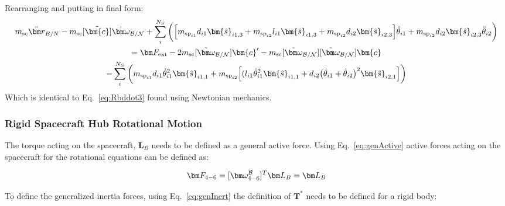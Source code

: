 Rearranging and putting in final form:
\begin{multline}
	m_{\text{sc}} \ddot{\bm r}_{B/N} -m_{\textnormal{sc}} [\tilde{\bm{c}}]\dot{\bm\omega}_{\cal B/N}
	+ \sum\limits_{i}^{N_S} \bigg( \Big[m_{\text{sp}_{i1}} d_{i1} \bm{\hat{s}}_{i1,3} + m_{\text{sp}_{i2}} l_{i1} \bm{\hat{s}}_{i1,3} +m_{\text{sp}_{i2}} d_{i2} \bm{\hat{s}}_{i2,3}\Big] \ddot{\theta}_{i1}
	+ m_{\text{sp}_{i2}}d_{i2} \bm{\hat{s}}_{i2,3} \ddot{\theta}_{i2} \bigg) \\
	= \bm F_{\text{ext}} - 2 m_{\textnormal{sc}}[\tilde{\bm\omega}_{\cal B/N}]\bm{c}' - m_{\textnormal{sc}} [\tilde{\bm\omega}_{\cal B/N}][\tilde{\bm\omega}_{\cal B/N}]\bm{c} \\- \sum\limits_{i}^{N_S} \bigg( m_{\text{sp}_{i1}} d_{i1} \dot{\theta}_{i1}^2 \bm{\hat{s}}_{i1,1} + m_{\text{sp}_{i2}} \Big[(l_{i1} \dot{\theta}_{i1}^2 \bm{\hat{s}}_{i1,1} + d_{i2}\big(\dot{\theta}_{i1} + \dot{\theta}_{i2}\big)^2\bm{\hat{s}}_{i2,1} \Big]\bigg)
\end{multline}
Which is identical to Eq.~\eqref{eq:Rbddot3} found using Newtonian mechanics.
\subsubsection{Rigid Spacecraft Hub Rotational Motion}

The torque acting on the spacecraft, $\bm L_B$ needs to be defined as a general active force. Using Eq.~\eqref{eq:genActive} active forces acting on the spacecraft for the rotational equations can be defined as:

\begin{equation}
	\bm F_{4-6} = [\bm \omega_{4-6}^{\cal{B}}]^T \bm L_B = \bm L_B
\end{equation}

To define the generalized inertia forces, using Eq.~\eqref{eq:genInert} the definition of $\bm T^*$ needs to be defined for a rigid body:

